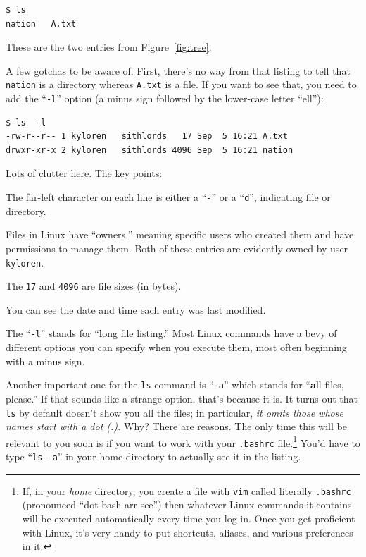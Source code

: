\begin{enumerate}
\begin{Verbatim}[fontsize=\small]
$ ls
nation   A.txt
\end{Verbatim}

These are the two entries from Figure~\ref{fig:tree}.

A few gotchas to be aware of. First, there's no way from that listing to
tell that \texttt{nation} is a directory whereas \texttt{A.txt} is a file. If
you want to see that, you need to add the ``\texttt{-l}'' option (a minus sign
followed by the lower-case letter ``ell''):

\begin{Verbatim}[fontsize=\footnotesize]
$ ls  -l
-rw-r--r-- 1 kyloren   sithlords   17 Sep  5 16:21 A.txt
drwxr-xr-x 2 kyloren   sithlords 4096 Sep  5 16:21 nation
\end{Verbatim}

Lots of clutter here. The key points:

\begin{compactitem}[-]
\item The far-left character on each line is either a ``\texttt{-}'' or a
``\texttt{d}'', indicating file or directory.
\item Files in Linux have ``owners,'' meaning specific users who created them
and have permissions to manage them. Both of these entries are evidently owned
by user \texttt{kyloren}.
\item The \texttt{17} and \texttt{4096} are file sizes (in bytes).
\item You can see the date and time each entry was last modified.
\end{compactitem}

The ``\texttt{-l}'' stands for ``\textbf{l}ong file listing.'' Most Linux
commands have a bevy of different options you can specify when you execute
them, most often beginning with a minus sign.

Another important one for the \texttt{ls} command is ``\texttt{-a}'' which
stands for ``\textbf{a}ll files, please.'' If that sounds like a strange
option, that's because it is. It turns out that \texttt{ls} by default doesn't
show you all the files; in particular, \textit{it omits those whose names start
with a dot (.).} Why? There are reasons. The only time this will be relevant to
you soon is if you want to work with your \texttt{.bashrc} file.\footnote{If,
in your \textit{home} directory, you create a file with \texttt{vim} called
literally \texttt{.bashrc} (pronounced ``dot-bash-arr-see'') then whatever
Linux commands it contains will be executed automatically every time you log
in. Once you get proficient with Linux, it's very handy to put shortcuts,
aliases, and various preferences in it.} You'd have to type ``\texttt{ls -a}''
in your home directory to actually see it in the listing.



\end{enumerate}
